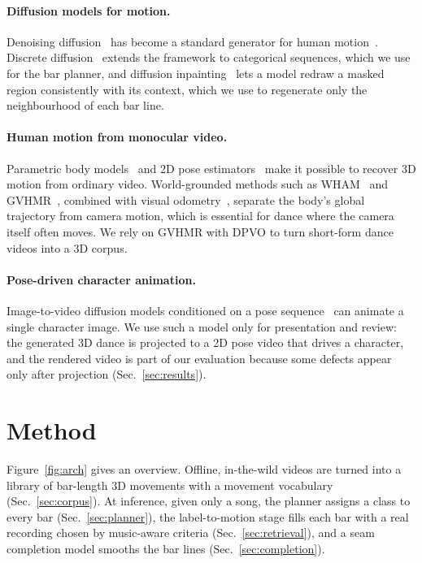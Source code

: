 \documentclass[10pt]{article}
\begin{document}
\paragraph{Diffusion models for motion.}
Denoising diffusion~\cite{ho2020ddpm} has become a standard generator for human motion~\cite{tevet2023mdm,tseng2023edge}.
Discrete diffusion~\cite{austin2021d3pm} extends the framework to categorical sequences, which we use for the bar planner, and diffusion inpainting~\cite{lugmayr2022repaint} lets a model redraw a masked region consistently with its context, which we use to regenerate only the neighbourhood of each bar line.

\paragraph{Human motion from monocular video.}
Parametric body models~\cite{loper2015smpl,pavlakos2019smplx} and 2D pose estimators~\cite{yang2023dwpose,xu2022vitpose} make it possible to recover 3D motion from ordinary video.
World-grounded methods such as WHAM~\cite{shin2024wham} and GVHMR~\cite{shen2024gvhmr}, combined with visual odometry~\cite{teed2023dpvo}, separate the body's global trajectory from camera motion, which is essential for dance where the camera itself often moves.
We rely on GVHMR with DPVO to turn short-form dance videos into a 3D corpus.

\paragraph{Pose-driven character animation.}
Image-to-video diffusion models conditioned on a pose sequence~\cite{hu2024animateanyone,wan2025} can animate a single character image.
We use such a model only for presentation and review: the generated 3D dance is projected to a 2D pose video that drives a character, and the rendered video is part of our evaluation because some defects appear only after projection (Sec.~\ref{sec:results}).

\section{Method}
\label{sec:method}

Figure~\ref{fig:arch} gives an overview.
Offline, in-the-wild videos are turned into a library of bar-length 3D movements with a movement vocabulary (Sec.~\ref{sec:corpus}).
At inference, given only a song, the planner assigns a class to every bar (Sec.~\ref{sec:planner}), the label-to-motion stage fills each bar with a real recording chosen by music-aware criteria (Sec.~\ref{sec:retrieval}), and a seam completion model smooths the bar lines (Sec.~\ref{sec:completion}).
\end{document}
